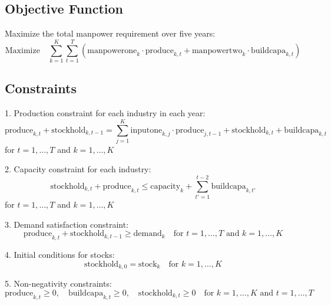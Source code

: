 \documentclass{article}
\begin{document}
\subsection*{Objective Function}
Maximize the total manpower requirement over five years:
\[
\text{Maximize} \quad \sum_{k=1}^{K} \sum_{t=1}^{T} (\text{manpowerone}_{k} \cdot \text{produce}_{k,t} + \text{manpowertwo}_{k} \cdot \text{buildcapa}_{k,t})
\]

\subsection*{Constraints}
1. Production constraint for each industry in each year:
\[
\text{produce}_{k,t} + \text{stockhold}_{k,t-1} = \sum_{j=1}^{K} \text{inputone}_{k,j} \cdot \text{produce}_{j,t-1} + \text{stockhold}_{k,t} + \text{buildcapa}_{k,t}
\]
for \( t = 1, \ldots, T \) and \( k = 1, \ldots, K \)

2. Capacity constraint for each industry:
\[
\text{stockhold}_{k,t} + \text{produce}_{k,t} \leq \text{capacity}_{k} + \sum_{t'=1}^{t-2} \text{buildcapa}_{k,t'}
\]
for \( t = 1, \ldots, T \) and \( k = 1, \ldots, K \)

3. Demand satisfaction constraint:
\[
\text{produce}_{k,t} + \text{stockhold}_{k,t-1} \geq \text{demand}_{k} \quad \text{for } t = 1, \ldots, T \text{ and } k = 1, \ldots, K
\]

4. Initial conditions for stocks:
\[
\text{stockhold}_{k,0} = \text{stock}_{k} \quad \text{for } k = 1, \ldots, K
\]

5. Non-negativity constraints:
\[
\text{produce}_{k,t} \geq 0, \quad \text{buildcapa}_{k,t} \geq 0, \quad \text{stockhold}_{k,t} \geq 0 \quad \text{for } k = 1, \ldots, K \text{ and } t = 1, \ldots, T
\]
\end{document}
